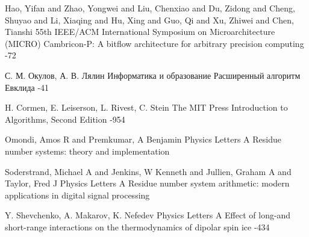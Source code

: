 \documentclass[10pt]{article}
\begin{document}
\begin{thebibliography}{20}
\setlength{\parsep}{0pt}\setlength{\itemsep}{3pt}


\by Hao, Yifan and Zhao, Yongwei and Liu, Chenxiao and Du, Zidong and Cheng, Shuyao and Li, Xiaqing and Hu, Xing and Guo, Qi and Xu, Zhiwei and Chen, Tianshi
 55th IEEE/ACM International Symposium on Microarchitecture (MICRO)
\paper Cambricon-P: A bitflow architecture for arbitrary precision computing
-72

\by С. М. Окулов, А. В. Лялин
\jour Информатика и образование
\paper Расширенный алгоритм Евклида
-41

\by H. Cormen, E. Leiserson, L. Rivest, C. Stein
\jour The MIT Press 
\paper Introduction to Algorithms, Second Edition
-954


\by Omondi, Amos R and Premkumar, A Benjamin
\jour Physics Letters A
\paper Residue number systems: theory and implementation


\by Soderstrand, Michael A and Jenkins, W Kenneth and Jullien, Graham A and Taylor, Fred J
\jour Physics Letters A
\paper Residue number system arithmetic: modern applications in digital signal processing

\by Y. Shevchenko, A. Makarov, K. Nefedev
\jour Physics Letters A
\paper Effect of long-and short-range interactions on the thermodynamics of dipolar spin ice
-434

\end{thebibliography}



\EndArticle
\end{document}
